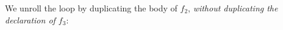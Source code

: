 {We unroll the loop by duplicating the body of $f_2$, \emph{without
duplicating the declaration of $f_3$}:
}
